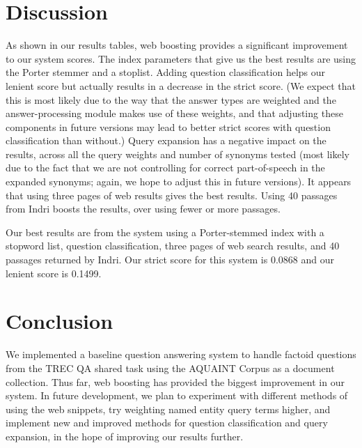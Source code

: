 \documentclass[11pt]{article}
\begin{document}
\section{Discussion}

As shown in our results tables, web boosting provides a significant improvement to our system scores.  The index parameters that give us the best results are using the Porter stemmer and a stoplist.  Adding question classification helps our lenient score but actually results in a decrease in the strict score. (We expect that this is most likely due to the way that the answer types are weighted and the answer-processing module makes use of these weights, and that adjusting these components in future versions may lead to better strict scores with question classification than without.)  Query expansion has a negative impact on the results, across all the query weights and number of synonyms tested (most likely due to the fact that we are not controlling for correct part-of-speech in the expanded synonyms; again, we hope to adjust this in future versions).  It appears that using three pages of web results gives the best results.  Using 40 passages from Indri boosts the results, over using fewer or more passages.

Our best results are from the system using a Porter-stemmed index with a stopword list, question classification, three pages of web search results, and 40 passages returned by Indri.  Our strict score for this system is 0.0868 and our lenient score is 0.1499.

\section{Conclusion}

We implemented a baseline question answering system to handle factoid questions from the TREC QA shared task using the AQUAINT Corpus as a document collection. Thus far, web boosting has provided the biggest improvement in our system. In future development, we plan to experiment with different methods of using the web snippets, try weighting named entity query terms higher, and implement new and improved methods for question classification and query expansion, in the hope of improving our results further.

\nocite{*}




\end{document}
